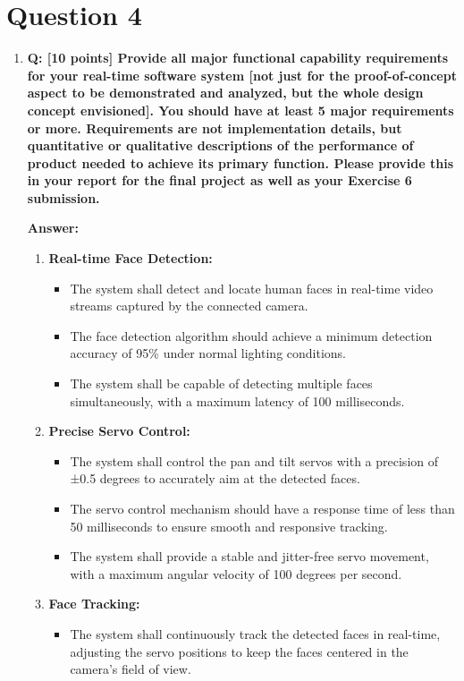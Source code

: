 \documentclass[a4paper,11pt]{article}%
\newenvironment{qanda}{\setlength{\parindent}{0pt}}{\bigskip}
\newcommand{\Q}{\bigskip\bfseries Q: }
\newcommand{\A}{\par\textbf{Answer: } \normalfont}
\begin{document}
\begin{qanda}
	\section{Question 4}
	\begin{enumerate}
		\item[] \Q [10 points] Provide all major functional capability requirements for your real-time
			software system [not just for the proof-of-concept aspect to be demonstrated and analyzed,
					but the whole design concept envisioned]. You should have at least 5 major requirements or
			more. Requirements are not implementation details, but quantitative or qualitative
			descriptions of the performance of product needed to achieve its primary function. Please
			provide this in your report for the final project as well as your Exercise 6 submission.
			\A
			\begin{enumerate}
				\item \textbf{Real-time Face Detection:}
				      \begin{itemize}
					      \item The system shall detect and locate human faces in real-time video streams captured by the connected camera.
					      \item The face detection algorithm should achieve a minimum detection accuracy of 95\% under normal lighting conditions.
					      \item The system shall be capable of detecting multiple faces simultaneously, with a maximum latency of 100 milliseconds.
				      \end{itemize}
				\item \textbf{Precise Servo Control:}
				      \begin{itemize}
					      \item The system shall control the pan and tilt servos with a precision of ±0.5 degrees to accurately aim at the detected faces.
					      \item The servo control mechanism should have a response time of less than 50 milliseconds to ensure smooth and responsive tracking.
					      \item The system shall provide a stable and jitter-free servo movement, with a maximum angular velocity of 100 degrees per second.
				      \end{itemize}
				\item \textbf{Face Tracking:}
				      \begin{itemize}
					      \item The system shall continuously track the detected faces in real-time, adjusting the servo positions to keep the faces centered in the camera's field of view.

\end{itemize}
\end{enumerate}
\end{enumerate}
\end{qanda}
\end{document}
